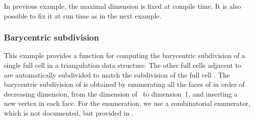 In previous example, the maximal dimension is fixed at compile time.
It is also possible to fix it at run time as in the next example.


\subsubsection{Barycentric subdivision}
This example provides a function for computing the barycentric subdivision of a
single full cell  in a triangulation data structure. The other 
full cells adjacent to  are automatically subdivided to match the
subdivision of the full cell . The barycentric subdivision of  is
obtained by enumerating all the faces of  in order of decreasing
dimension, from the dimension of~ to dimension~1, and inserting a new
vertex in each face. For the enumeration, we use a combinatorial enumerator,
which is not documented, but provided in \cgal.


